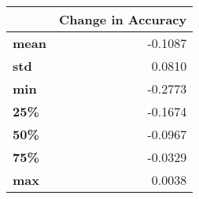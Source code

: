 \begin{tabular}{lr}
\toprule
{} &  Change in Accuracy \\
\midrule
\textbf{mean} &             -0.1087 \\
\textbf{std } &              0.0810 \\
\textbf{min } &             -0.2773 \\
\textbf{25\% } &             -0.1674 \\
\textbf{50\% } &             -0.0967 \\
\textbf{75\% } &             -0.0329 \\
\textbf{max } &              0.0038 \\
\bottomrule
\end{tabular}
